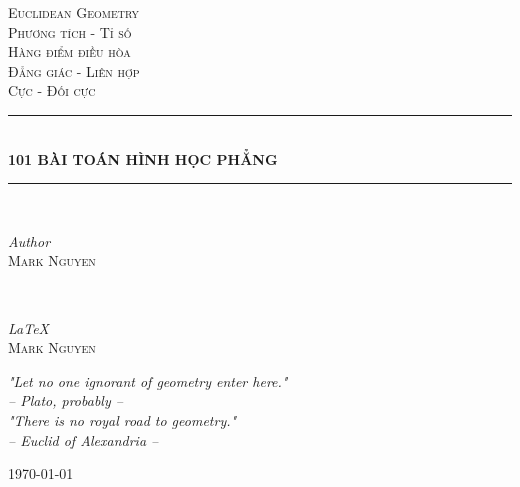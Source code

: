 \begin{titlepage}

    \newcommand{\HRule}{\rule{\linewidth}{0.5mm}} 
    \center
    
    
    \textsc{\LARGE Euclidean Geometry}\\[1.5cm] 
    \textsc{\Large Phương tích - Tỉ số}\\[0.5cm] 
    \textsc{\Large Hàng điểm điều hòa}\\[0.5cm] 
    \textsc{\Large Đẳng giác - Liên hợp}\\[0.5cm] 
    \textsc{\Large Cực - Đối cực}\\[1.5cm]
    
    
    \HRule\\[0.4cm]
    
    {\huge\bfseries 101 BÀI TOÁN HÌNH HỌC PHẲNG}\\[0.1cm]
    
    \HRule\\[1.5cm]
    
    
    \begin{minipage}{0.4\textwidth}
        \begin{flushleft}
            \large
            \textit{Author}\\
            \textsc{Mark Nguyen}
        \end{flushleft}
    \end{minipage}
    ~
    \begin{minipage}{0.4\textwidth}
        \begin{flushright}
            \large
            \textit{\LaTeX}\\
            \textsc{Mark Nguyen}
        \end{flushright}
    \end{minipage}
    

    \vfill\vfill

    \textit{"Let no one ignorant of geometry enter here."}\\[0.25cm]
    \textit{-- Plato, probably --}\\[0.75cm]

    \textit{"There is no royal road to geometry."}\\[0.25cm]
    \textit{-- Euclid of Alexandria --}
    
    
    \vfill\vfill\vfill
    {\large\today}

    \vfill
    
\end{titlepage}